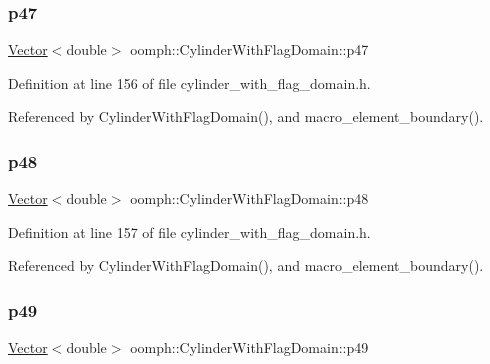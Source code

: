 \subsubsection{\texorpdfstring{p47}{p47}}
{\footnotesize\ttfamily \hyperlink{classoomph_1_1Vector}{Vector}$<$double$>$ oomph\+::\+Cylinder\+With\+Flag\+Domain\+::p47\hspace{0.3cm}{\ttfamily [private]}}



Definition at line 156 of file cylinder\+\_\+with\+\_\+flag\+\_\+domain.\+h.



Referenced by Cylinder\+With\+Flag\+Domain(), and macro\+\_\+element\+\_\+boundary().

\mbox{\label{classoomph_1_1CylinderWithFlagDomain_ae02eac305b33b85a2e87df1764e4b8d8}} 
\subsubsection{\texorpdfstring{p48}{p48}}
{\footnotesize\ttfamily \hyperlink{classoomph_1_1Vector}{Vector}$<$double$>$ oomph\+::\+Cylinder\+With\+Flag\+Domain\+::p48\hspace{0.3cm}{\ttfamily [private]}}



Definition at line 157 of file cylinder\+\_\+with\+\_\+flag\+\_\+domain.\+h.



Referenced by Cylinder\+With\+Flag\+Domain(), and macro\+\_\+element\+\_\+boundary().

\mbox{\label{classoomph_1_1CylinderWithFlagDomain_aa5418e036166408fb5df662d93479a84}} 
\subsubsection{\texorpdfstring{p49}{p49}}
{\footnotesize\ttfamily \hyperlink{classoomph_1_1Vector}{Vector}$<$double$>$ oomph\+::\+Cylinder\+With\+Flag\+Domain\+::p49\hspace{0.3cm}{\ttfamily [private]}}



